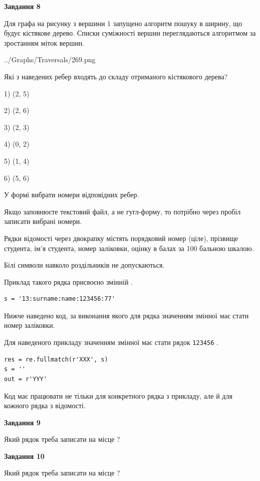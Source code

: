 \documentclass[12pt, ukrainian]{article}
\def\code#1{\Verb!#1!}
\begin{document}
{\begin {large}
{\begin {center}\textbf{Завдання 8}\end {center}}\par
Для графа на рисунку з вершини 1 запущено алгоритм пошуку в ширину, що будує кістякове дерево. Списки суміжності вершин переглядаються алгоритмом за зростанням міток вершин.\par
\begin{center}
	{../Graphs/Traversals/269.png}
\end{center}
\par Які з наведених ребер входять до складу отриманого кістякового дерева?\par
1) (2, 5)\par
2) (2, 6)\par
3) (2, 3)\par
4) (0, 2)\par
5) (1, 4)\par
6) (5, 6)\par
{\vskip 15pt} У формі вибрати номери відповідних ребер.


Якщо заповнюєте текстовий файл, а не гугл-форму, то потрібно через пробіл записа\-ти вибрані номери.\par
\newpage


Рядки відомості через двокрапку містять порядковий номер (ціле), пріз\-ви\-ще студен\-та, ім'я студента, номер заліковки, оцінку в балах за 100 бальною шкалою.

Білі символи навколо роздільників не допускаються.

Приклад такого рядка присвоєно змінній .



\begin{verbatim}
s = '13:surname:name:123456:77'
\end{verbatim}


Нижче наведено код, за виконання якого для рядка  значенням змінної  має стати номер заліковки.

Для наведеного прикладу значенням змінної  має стати рядок \code{123456} .



\begin{verbatim}
res = re.fullmatch(r'XXX', s)
s = ''
out = r'YYY'
\end{verbatim}


Код має працювати не тільки для конкретного рядка з прикладу, але й для кожного рядка з відомості.

{\begin {center}\textbf{Завдання 9}\end {center}}\par
Який рядок треба записати на місце  ?\par
\vspace{5mm}


{\begin {center}\textbf{Завдання 10}\end {center}}\par
Який рядок треба записати на місце  ?\par


\newpage


\end {large}}
\end{document}
